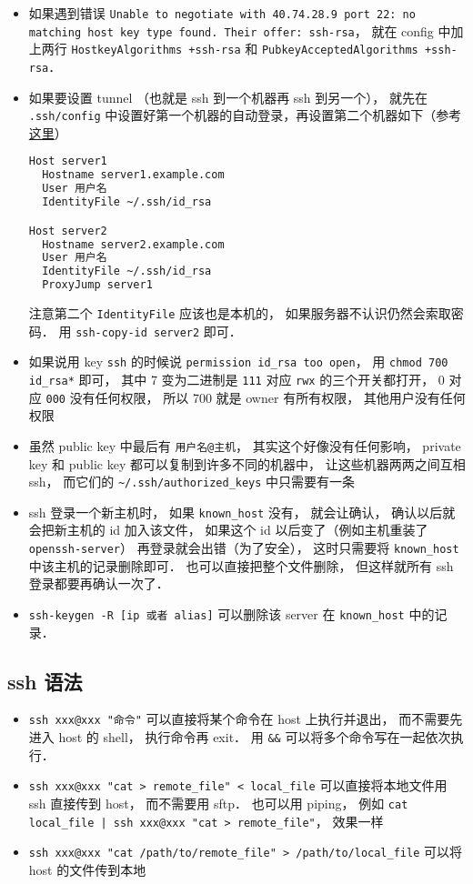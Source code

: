 \begin{itemize}
\item 如果遇到错误 \verb|Unable to negotiate with 40.74.28.9 port 22: no matching host key type found. Their offer: ssh-rsa|， 就在 config 中加上两行 \verb|HostkeyAlgorithms +ssh-rsa| 和 \verb|PubkeyAcceptedAlgorithms +ssh-rsa|．

\item 如果要设置 tunnel （也就是 ssh 到一个机器再 ssh 到另一个）， 就先在 \verb|.ssh/config| 中设置好第一个机器的自动登录，再设置第二个机器如下（参考\href{https://askubuntu.com/questions/311447/how-do-i-ssh-to-machine-a-via-b-in-one-command}{这里}）
\begin{lstlisting}[language=bash]
Host server1
  Hostname server1.example.com
  User 用户名
  IdentityFile ~/.ssh/id_rsa

Host server2
  Hostname server2.example.com
  User 用户名
  IdentityFile ~/.ssh/id_rsa
  ProxyJump server1
\end{lstlisting}
注意第二个 \verb|IdentityFile| 应该也是本机的， 如果服务器不认识仍然会索取密码． 用 \verb|ssh-copy-id server2| 即可．

\item 如果说用 key \verb`ssh` 的时候说 \verb`permission id_rsa too open`， 用 \verb`chmod 700 id_rsa*` 即可， 其中 7 变为二进制是 \verb`111` 对应 \verb`rwx` 的三个开关都打开， 0 对应 \verb`000` 没有任何权限， 所以 700 就是 owner 有所有权限， 其他用户没有任何权限
\item 虽然 public key 中最后有 \verb`用户名@主机`， 其实这个好像没有任何影响， private key 和 public key 都可以复制到许多不同的机器中， 让这些机器两两之间互相 ssh， 而它们的 \verb`~/.ssh/authorized_keys` 中只需要有一条
\item ssh 登录一个新主机时， 如果 \verb`known_host` 没有， 就会让确认， 确认以后就会把新主机的 id 加入该文件， 如果这个 id 以后变了（例如主机重装了 \verb`openssh-server`） 再登录就会出错（为了安全）， 这时只需要将 \verb`known_host` 中该主机的记录删除即可． 也可以直接把整个文件删除， 但这样就所有 ssh 登录都要再确认一次了．
\item \verb|ssh-keygen -R [ip 或者 alias]| 可以删除该 server 在 \verb|known_host| 中的记录．
\end{itemize}

\subsection{ssh 语法}
\begin{itemize}
\item \verb`ssh xxx@xxx "命令"` 可以直接将某个命令在 host 上执行并退出， 而不需要先进入 host 的 shell， 执行命令再 exit． 用 \verb`&&` 可以将多个命令写在一起依次执行．
\item \verb`ssh xxx@xxx "cat > remote_file" < local_file` 可以直接将本地文件用 ssh 直接传到 host， 而不需要用 sftp． 也可以用 piping， 例如 \verb`cat local_file | ssh xxx@xxx "cat > remote_file"`， 效果一样
\item \verb`ssh xxx@xxx "cat /path/to/remote_file" > /path/to/local_file` 可以将 host 的文件传到本地
\end{itemize}

